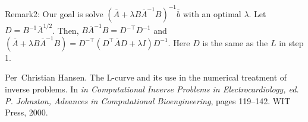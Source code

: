 \documentclass{article} %
\theoremstyle{plain}
\numberwithin{equation}{section}
\def\Abar{\overline{A}}
\def\bbar{\overline{b}}
\begin{document}
Remark2: Our goal is solve $(\Abar+\lambda B \Abar^{-1}B)^{-1}\bbar $ with an optimal $\lambda$. Let $D= B^{-1}\Abar^{1/2} $. Then, $B \Abar^{-1}B = D^{-\top}D^{-1}$ and $(\Abar+\lambda B \Abar^{-1}B) = D^{-\top}(D^{\top} \Abar D  +\lambda I) D^{-1}$. Here $D$ is the same as the $L$ in step 1. 




% 
\begin{thebibliography}{Han00}

Per~Christian Hansen.
\newblock The {L}-curve and its use in the numerical treatment of inverse
  problems.
\newblock In {\em in Computational Inverse Problems in Electrocardiology, ed.
  P. Johnston, Advances in Computational Bioengineering}, pages 119--142. WIT
  Press, 2000.

\end{thebibliography}
\end{document}
